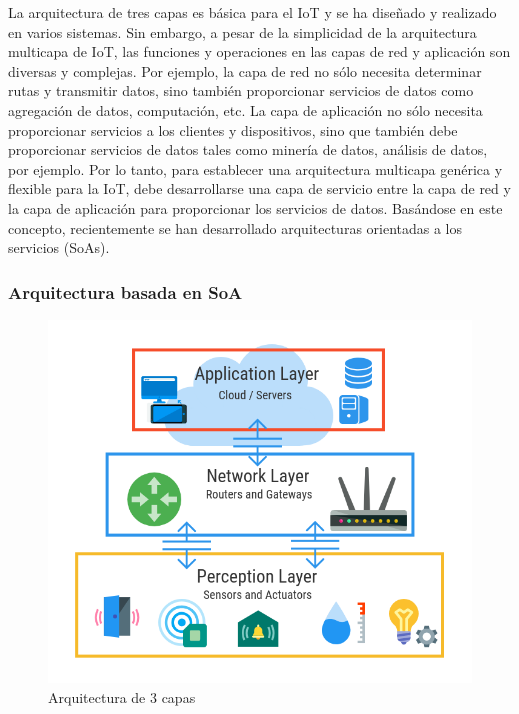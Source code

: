 {La arquitectura de tres capas es básica para el IoT y se ha diseñado y realizado en varios sistemas. Sin embargo, a pesar de la simplicidad de la arquitectura multicapa de IoT, las funciones y operaciones en las capas de red y aplicación son diversas y complejas. Por ejemplo, la capa de red no sólo necesita determinar rutas y transmitir datos, sino también proporcionar servicios de datos como agregación de datos, computación, etc. La capa de aplicación no sólo necesita proporcionar servicios a los clientes y dispositivos, sino que también debe proporcionar servicios de datos tales como minería de datos, análisis de datos, por ejemplo. Por lo tanto, para establecer una arquitectura multicapa genérica y flexible para la IoT, debe desarrollarse una capa de servicio entre la capa de red y la capa de aplicación para proporcionar los servicios de datos. Basándose en este concepto, recientemente se han desarrollado arquitecturas orientadas a los servicios (SoAs).

\subsubsection{Arquitectura basada en SoA}

\cite{lin2017survey}

\begin{figure}[ht!]
    \centering
    \includegraphics[width=\linewidth]{imagenes/arch-3-layer.png}
    \caption{Arquitectura de 3 capas}
    \label{fig:figure1}
\end{figure}

}
